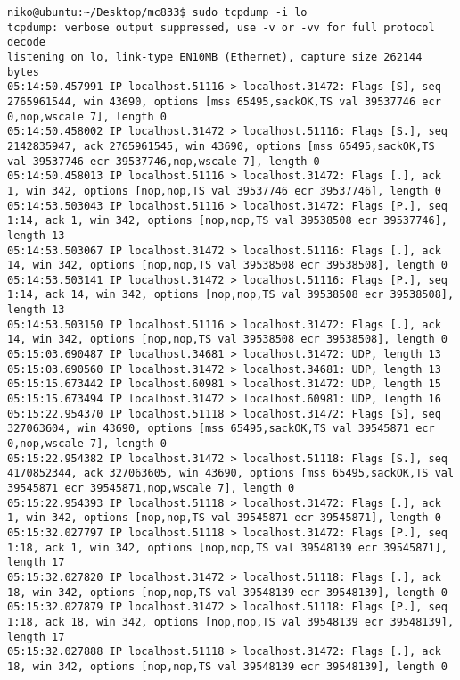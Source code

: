 \documentclass[a4paper,10pt]{article}
\begin{document}
\begin{lstlisting}
niko@ubuntu:~/Desktop/mc833$ sudo tcpdump -i lo
tcpdump: verbose output suppressed, use -v or -vv for full protocol decode
listening on lo, link-type EN10MB (Ethernet), capture size 262144 bytes
05:14:50.457991 IP localhost.51116 > localhost.31472: Flags [S], seq 2765961544, win 43690, options [mss 65495,sackOK,TS val 39537746 ecr 0,nop,wscale 7], length 0
05:14:50.458002 IP localhost.31472 > localhost.51116: Flags [S.], seq 2142835947, ack 2765961545, win 43690, options [mss 65495,sackOK,TS val 39537746 ecr 39537746,nop,wscale 7], length 0
05:14:50.458013 IP localhost.51116 > localhost.31472: Flags [.], ack 1, win 342, options [nop,nop,TS val 39537746 ecr 39537746], length 0
05:14:53.503043 IP localhost.51116 > localhost.31472: Flags [P.], seq 1:14, ack 1, win 342, options [nop,nop,TS val 39538508 ecr 39537746], length 13
05:14:53.503067 IP localhost.31472 > localhost.51116: Flags [.], ack 14, win 342, options [nop,nop,TS val 39538508 ecr 39538508], length 0
05:14:53.503141 IP localhost.31472 > localhost.51116: Flags [P.], seq 1:14, ack 14, win 342, options [nop,nop,TS val 39538508 ecr 39538508], length 13
05:14:53.503150 IP localhost.51116 > localhost.31472: Flags [.], ack 14, win 342, options [nop,nop,TS val 39538508 ecr 39538508], length 0
05:15:03.690487 IP localhost.34681 > localhost.31472: UDP, length 13
05:15:03.690560 IP localhost.31472 > localhost.34681: UDP, length 13
05:15:15.673442 IP localhost.60981 > localhost.31472: UDP, length 15
05:15:15.673494 IP localhost.31472 > localhost.60981: UDP, length 16
05:15:22.954370 IP localhost.51118 > localhost.31472: Flags [S], seq 327063604, win 43690, options [mss 65495,sackOK,TS val 39545871 ecr 0,nop,wscale 7], length 0
05:15:22.954382 IP localhost.31472 > localhost.51118: Flags [S.], seq 4170852344, ack 327063605, win 43690, options [mss 65495,sackOK,TS val 39545871 ecr 39545871,nop,wscale 7], length 0
05:15:22.954393 IP localhost.51118 > localhost.31472: Flags [.], ack 1, win 342, options [nop,nop,TS val 39545871 ecr 39545871], length 0
05:15:32.027797 IP localhost.51118 > localhost.31472: Flags [P.], seq 1:18, ack 1, win 342, options [nop,nop,TS val 39548139 ecr 39545871], length 17
05:15:32.027820 IP localhost.31472 > localhost.51118: Flags [.], ack 18, win 342, options [nop,nop,TS val 39548139 ecr 39548139], length 0
05:15:32.027879 IP localhost.31472 > localhost.51118: Flags [P.], seq 1:18, ack 18, win 342, options [nop,nop,TS val 39548139 ecr 39548139], length 17
05:15:32.027888 IP localhost.51118 > localhost.31472: Flags [.], ack 18, win 342, options [nop,nop,TS val 39548139 ecr 39548139], length 0

\end{lstlisting}
\end{document}
